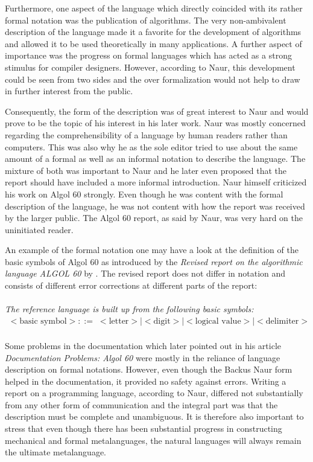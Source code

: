 \documentclass{article}
\begin{document}
Furthermore, one aspect of the language which directly coincided with its rather formal notation was the publication of algorithms. The very non-ambivalent description of the language made it a favorite for the development of algorithms and allowed it to be used theoretically in many applications. A further aspect of importance was the progress on formal languages which has acted as a strong stimulus for compiler designers. However, according to Naur, this development could be seen from two sides and the over formalization would not help to draw in further interest from the public.

Consequently, the form of the description was of great interest to Naur and would prove to be the topic of his interest in his later work. Naur was mostly concerned regarding the comprehensibility of a language by human readers rather than computers. This was also why he as the sole editor tried to use about the same amount of a formal as well as an informal notation to describe the language. The mixture of both was important to Naur and he later even proposed that the report should have included a more informal introduction. Naur himself criticized his work on Algol 60 strongly. Even though he was content with the formal description of the language, he was not content with how the report was received by the larger public. The Algol 60 report, as said by Naur, was very hard on the uninitiated reader.

An example of the formal notation one may have a look at the definition of the basic symbols of Algol 60 as introduced by the \textit{Revised report on the algorithmic language ALGOL 60} by \cite{Backus1963RevisedRO}. The revised report does not differ in notation and consists of different error corrections at different parts of the report:
\\ \\
\textit{The reference language is built up from the following basic symbols:}
\begin{equation} \label{eq5}
\begin{split}
<\text{basic symbol}> ::=&<\text{letter}>|<\text{digit}>|<\text{logical value}>|<\text{delimiter}> \\
\end{split}
\end{equation}

Some problems in the documentation which \citet{naur1963documentation} later pointed out in his article \textit{Documentation Problems: Algol 60} were mostly in the reliance of language description on formal notations. However, even though the Backus Naur form helped in the documentation, it provided no safety against errors. Writing a report on a programming language, according to Naur, differed not substantially from any other form of communication and the integral part was that the description must be complete and unambiguous. It is therefore also important to stress that even though there has been substantial progress in constructing mechanical and formal metalanguages, the natural languages will always remain the ultimate metalanguage.
\end{document}
